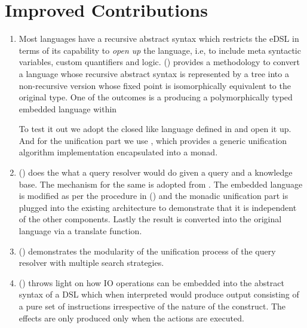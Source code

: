 \documentclass[thesis-solanki.tex]{subfiles}
\begin{document}
\section{Improved Contributions}
\begin{enumerate}
\item
  Most languages have a recursive abstract syntax which restricts the eDSL
  in terms of its capability to
  \textit{open up} the language{\large,} i.e{\large,}
  to include meta syntactic variables, custom quantifiers and logic.
  () provides a methodology to convert a language whose recursive abstract
  syntax is represented by a tree into a non-recursive version whose fixed point is isomorphically equivalent to
  the original type.
  One of the outcomes is a producing a polymorphically typed embedded language within 

  To test it out we adopt the closed  like language defined in \cite{prolog-lib} and open it up.
  And for the unification part we use \cite{unification-fd-lib}, which provides a generic unification algorithm
  implementation encapsulated into a monad.

\item
  () does the what a  query resolver would do given a
  query and a knowledge base.
  The mechanism for the same is adopted from \cite{prolog-lib}.
  The embedded language is modified as per the procedure in () and the
  monadic unification part is plugged into the existing architecture to demonstrate that it is independent of the
  other components.
  Lastly the result is converted into the original language via a translate function.

\item
  () demonstrates the modularity of the unification process of the query
  resolver with multiple search strategies.

\item
  () throws light on how IO operations can be embedded into the abstract
  syntax of a DSL which when interpreted would produce output consisting of a pure set of instructions irrespective
  of the nature of the construct.
  The effects are only produced only when the actions are executed.
\end{enumerate}
\end{document}
